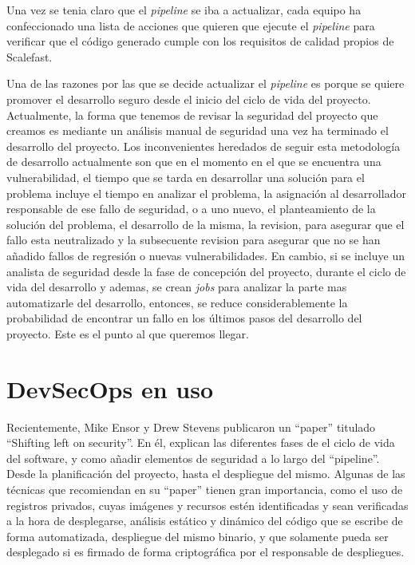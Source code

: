 \documentclass[12pt]{report} %
\begin{document}
Una vez se tenia claro que el \textit{\gls{pipeline}} se iba a actualizar, cada
equipo ha confeccionado una lista de acciones que quieren que ejecute el
\textit{\gls{pipeline}} para verificar que el código generado cumple con los
requisitos de calidad propios de Scalefast.

Una de las razones por las que se decide actualizar el \textit{\gls{pipeline}}
es porque se quiere promover el desarrollo seguro desde el inicio del ciclo de
vida del proyecto.  Actualmente, la forma que tenemos de revisar la seguridad
del proyecto que creamos es mediante un análisis manual de seguridad una vez ha
terminado el desarrollo del proyecto.  Los inconvenientes heredados de seguir
esta metodología de desarrollo actualmente son que en el momento en el que se
encuentra una vulnerabilidad, el tiempo que se tarda en desarrollar una solución
para el problema incluye el tiempo en analizar el problema, la asignación al
desarrollador responsable de ese fallo de seguridad, o a uno nuevo, el
planteamiento de la solución del problema, el desarrollo de la misma, la
revision, para asegurar que el fallo esta neutralizado y la subsecuente revision
para asegurar que no se han añadido fallos de regresión o nuevas
vulnerabilidades.  En cambio, si se incluye un analista de seguridad desde la
fase de concepción del proyecto, durante el ciclo de vida del desarrollo y
ademas, se crean \textit{\gls{job}s} para analizar la parte mas automatizarle
del desarrollo, entonces, se reduce considerablemente la probabilidad de
encontrar un fallo en los últimos pasos del desarrollo del proyecto.  Este es el
punto al que queremos llegar.

\section{DevSecOps en uso}

Recientemente, Mike Ensor y Drew Stevens publicaron un ``paper'' titulado
``Shifting left on security''.  En él, explican las diferentes fases de el ciclo
de vida del software, y como añadir elementos de seguridad a lo largo del
``pipeline''.  Desde la planificación del proyecto, hasta el despliegue del
mismo.  Algunas de las técnicas que recomiendan en su ``paper'' tienen gran
importancia, como el uso de registros privados, cuyas imágenes y recursos estén
identificadas y sean verificadas a la hora de desplegarse, análisis estático y
dinámico del código que se escribe de forma automatizada, despliegue del mismo
binario, y que solamente pueda ser desplegado si es firmado de forma
criptográfica por el responsable de despliegues.\cite{Ensor2021}
\end{document}
